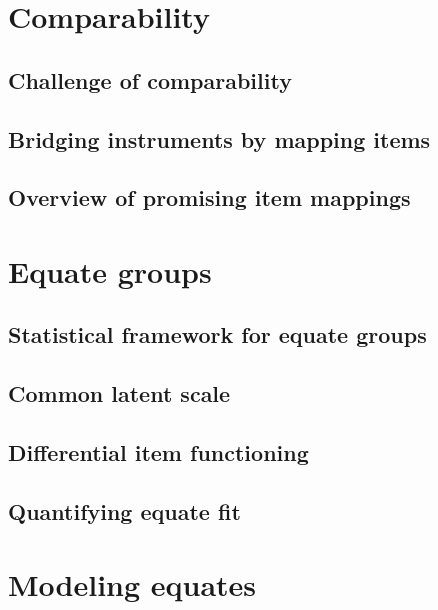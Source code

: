\documentclass[]{book}
\theoremstyle{definition}
\theoremstyle{definition}
\theoremstyle{definition}
\theoremstyle{remark}
\begin{document}
\chapter{Comparability}\label{ch:comparability}

\section{Challenge of comparability}\label{challenge-of-comparability}

\section{Bridging instruments by mapping
items}\label{bridging-instruments-by-mapping-items}

\section{Overview of promising item
mappings}\label{overview-of-promising-item-mappings}

\chapter{Equate groups}\label{ch:equategroups}

\section{Statistical framework for equate
groups}\label{statistical-framework-for-equate-groups}

\section{Common latent scale}\label{common-latent-scale}

\section{Differential item
functioning}\label{differential-item-functioning}

\section{Quantifying equate fit}\label{quantifying-equate-fit}

\chapter{Modeling equates}\label{ch:modelingequates}
\end{document}
